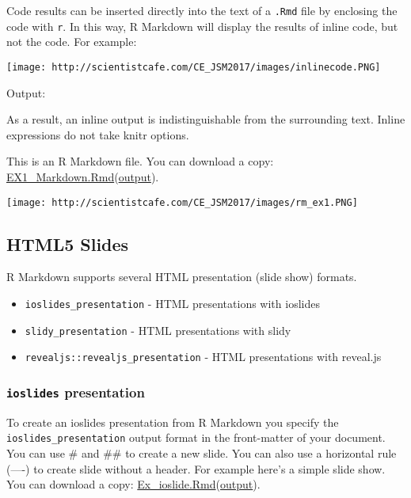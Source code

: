 \documentclass[
]{article}
\providecommand{\tightlist}{%
  \setlength{\itemsep}{0pt}\setlength{\parskip}{0pt}}
\begin{document}
\begin{itemize}
  Code results can be inserted directly into the text of a \texttt{.Rmd}
  file by enclosing the code with \texttt{r}. In this way, R Markdown
  will display the results of inline code, but not the code. For
  example:

  \texttt{[image: http://scientistcafe.com/CE\_JSM2017/images/inlinecode.PNG]}

  Output:

  As a result, an inline output is indistinguishable from the
  surrounding text. Inline expressions do not take knitr options.
\end{itemize}

This is an R Markdown file. You can download a copy:
\href{https://raw.githubusercontent.com/happyrabbit/linhui.org/gh-pages/CE_JSM2017/Examples/EX1_Markdown.Rmd}{EX1\_Markdown.Rmd}(\href{http://scientistcafe.com/CE_JSM2017/Examples/EX1_Markdown.html}{output}).

\texttt{[image: http://scientistcafe.com/CE\_JSM2017/images/rm\_ex1.PNG]}

\hypertarget{html5-slides}{%
\subsection{HTML5 Slides}\label{html5-slides}}

R Markdown supports several HTML presentation (slide show) formats.

\begin{itemize}
\tightlist
\item
  \texttt{ioslides\_presentation} - HTML presentations with ioslides
\item
  \texttt{slidy\_presentation} - HTML presentations with slidy
\item
  \texttt{revealjs::revealjs\_presentation} - HTML presentations with
  reveal.js
\end{itemize}

\hypertarget{ioslides-presentation}{%
\subsubsection{\texorpdfstring{\texttt{ioslides}
presentation}{ioslides presentation}}\label{ioslides-presentation}}

To create an ioslides presentation from R Markdown you specify the
\texttt{ioslides\_presentation} output format in the front-matter of
your document. You can use \# and \#\# to create a new slide. You can
also use a horizontal rule (----) to create slide without a header. For
example here's a simple slide show. You can download a copy:
\href{https://raw.githubusercontent.com/happyrabbit/linhui.org/gh-pages/CE_JSM2017/Examples/Ex_ioslide.Rmd}{Ex\_ioslide.Rmd}(\href{http://scientistcafe.com/CE_JSM2017/Examples/Ex_ioslide.html}{output}).
\end{document}
